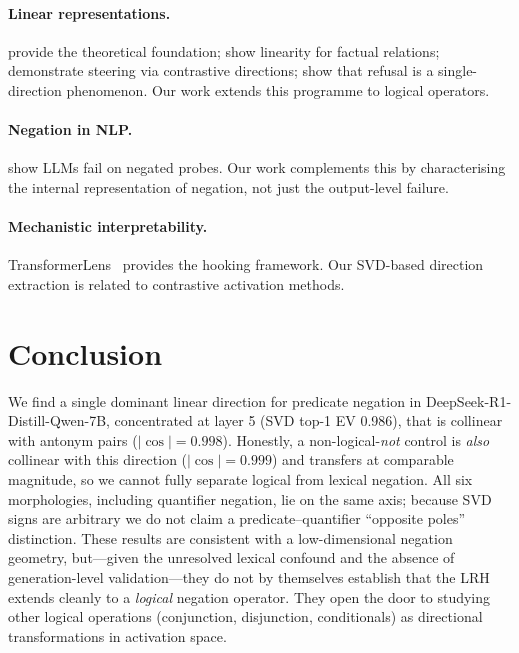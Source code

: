 \documentclass{article}
\begin{document}
\paragraph{Linear representations.}
\citet{park2024linear} provide the theoretical foundation; \citet{hernandez2023linearity} show linearity for factual relations; \citet{zou2023representation} demonstrate steering via contrastive directions; \citet{arditi2024refusal} show that refusal is a single-direction phenomenon.
Our work extends this programme to logical operators.

\paragraph{Negation in NLP.}
\citet{kassner2020negated} show LLMs fail on negated probes.
Our work complements this by characterising the internal representation of negation, not just the output-level failure.

\paragraph{Mechanistic interpretability.}
TransformerLens~\citep{nanda2022transformerlens} provides the hooking framework.
Our SVD-based direction extraction is related to contrastive activation methods.

\section{Conclusion}
\label{sec:conclusion}

We find a single dominant linear direction for predicate negation in DeepSeek-R1-Distill-Qwen-7B, concentrated at layer 5 (SVD top-1 EV 0.986), that is collinear with antonym pairs ($|\cos|=0.998$). Honestly, a non-logical-\textit{not} control is \emph{also} collinear with this direction ($|\cos|=0.999$) and transfers at comparable magnitude, so we cannot fully separate logical from lexical negation. All six morphologies, including quantifier negation, lie on the same axis; because SVD signs are arbitrary we do not claim a predicate--quantifier ``opposite poles'' distinction.
These results are consistent with a low-dimensional negation geometry, but---given the unresolved lexical confound and the absence of generation-level validation---they do not by themselves establish that the LRH extends cleanly to a \emph{logical} negation operator.
They open the door to studying other logical operations (conjunction, disjunction, conditionals) as directional transformations in activation space.
\end{document}
